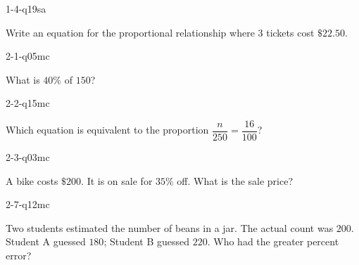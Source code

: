 
\begin{practiceQuestion}{1-4-q19}{sa}
\begin{questionText}
Write an equation for the proportional relationship where $3$ tickets cost $\$22.50$.
\end{questionText}
\end{practiceQuestion}

\begin{practiceQuestion}{2-1-q05}{mc}
\begin{questionText}
What is $40\%$ of $150$?
\end{questionText}
\end{practiceQuestion}

\begin{practiceQuestion}{2-2-q15}{mc}
\begin{questionText}
Which equation is equivalent to the proportion $\dfrac{n}{250} = \dfrac{16}{100}$?
\end{questionText}
\end{practiceQuestion}

\begin{practiceQuestion}{2-3-q03}{mc}
\begin{questionText}
A bike costs $\$200$. It is on sale for $35\%$ off. What is the sale price?
\end{questionText}
\end{practiceQuestion}

\begin{practiceQuestion}{2-7-q12}{mc}
\begin{questionText}
Two students estimated the number of beans in a jar. The actual count was $200$. Student A guessed $180$; Student B guessed $220$. Who had the greater percent error?
\end{questionText}
\end{practiceQuestion}

